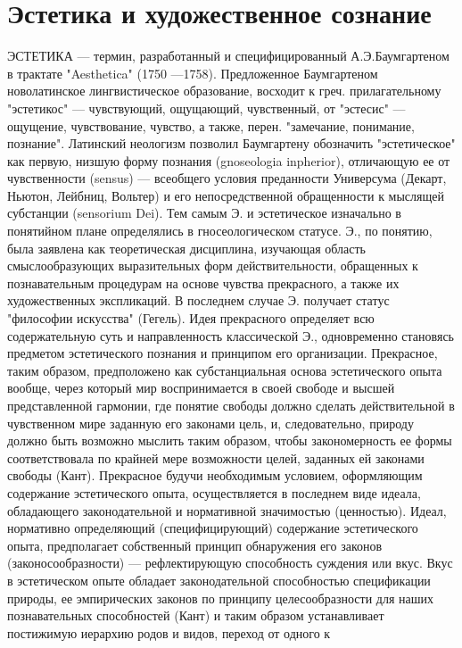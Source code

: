\documentclass[12pt]{article}
\begin{document}
\section{Эстетика и художественное сознание}
ЭСТЕТИКА — термин, разработанный и специфицированный А.Э.Баумгартеном в трактате "Aesthetica" (1750
—1758).  Предложенное  Баумгартеном  новолатинское  лингвистическое  образование,  восходит  к  греч.
прилагательному  "эстетикос"  —  чувствующий,  ощущающий,  чувственный,  от  "эстесис"  —  ощущение,
чувствование,  чувство,  а  также,  перен.  "замечание,  понимание,  познание".  Латинский  неологизм  позволил
Баумгартену  обозначить  "эстетическое"  как  первую,  низшую  форму  познания  (gnoseologia  inpherior),
отличающую ее от чувственности (sensus) — всеобщего условия преданности Универсума (Декарт, Ньютон,
Лейбниц, Вольтер) и его непосредственной обращенности к мыслящей субстанции (sensorium Dei). Тем самым
Э. и эстетическое изначально в понятийном плане определялись в гносеологическом статусе. Э., по понятию,
была заявлена как теоретическая дисциплина, изучающая область смыслообразующих выразительных форм
действительности,  обращенных  к  познавательным  процедурам  на  основе  чувства  прекрасного,  а  также  их
художественных экспликаций. В последнем случае Э. получает статус "философии искусства" (Гегель). Идея
прекрасного определяет всю содержательную суть и направленность классической Э., одновременно становясь
предметом эстетического познания и принципом его организации. Прекрасное, таким образом, предположено
как субстанциальная основа эстетического опыта вообще, через который мир воспринимается в своей свободе и
высшей представленной гармонии, где понятие свободы должно сделать действительной в чувственном мире
заданную его законами цель, и, следовательно, природу должно быть возможно мыслить таким образом, чтобы
закономерность ее формы соответствовала по крайней мере возможности целей, заданных ей законами свободы
(Кант).  Прекрасное  будучи  необходимым  условием,  оформляющим  содержание  эстетического  опыта,
осуществляется  в  последнем  виде  идеала,  обладающего  законодательной  и  нормативной  значимостью
(ценностью).  Идеал,  нормативно  определяющий  (специфицирующий)  содержание  эстетического  опыта,
предполагает  собственный  принцип  обнаружения  его  законов  (законосообразности)  —  рефлектирующую
способность  суждения  или  вкус.  Вкус  в  эстетическом  опыте  обладает  законодательной  способностью
спецификации природы, ее эмпирических законов по принципу целесообразности для наших познавательных
способностей (Кант) и таким образом устанавливает постижимую иерархию родов и видов, переход от одного к
\end{document}
